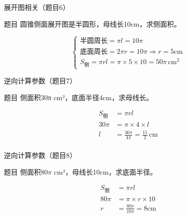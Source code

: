 \begin{frame}{展开图相关（题目6）}
    \begin{block}{题目}
    圆锥侧面展开图是半圆形，母线长10cm，求侧面积。
    \end{block}
    
    \pause

    \begin{equation*}
    \begin{cases}
    \text{半圆周长} = \pi l = 10\pi \\
    \text{底面周长} = 2\pi r = 10\pi \Rightarrow r = 5\text{cm} \\
    S_{\text{侧}} = \pi r l = \pi \times 5 \times 10 = 50\pi \,\text{cm}^2
    \end{cases}
    \end{equation*}
    \end{frame}



\begin{frame}{逆向计算参数（题目7）}
    \begin{block}{题目}
    侧面积30π cm²，底面半径4cm，求母线长。
    \end{block}
    \pause
    
    \begin{align*}
    S_{\text{侧}} &= \pi r l \\
    30\pi &= \pi \times 4 \times l \\
    l &= \frac{30\pi}{4\pi} = \frac{15}{2}\,\text{cm} \\
    \end{align*}
    

    \end{frame}
    
    \begin{frame}{逆向计算参数（题目8）}
    \begin{block}{题目}
    侧面积80$\pi$ cm²，母线长10cm，求底面半径。
    \end{block}
    \pause
    
    $$
    \begin{aligned}
    S_{\text{侧}} &= \pi r l \\
    80\pi &= \pi \times r \times 10 \\
    r &= \frac{80\pi}{10\pi} = 8\text{cm}
    \end{aligned}
    $$
    
   
    \end{frame}
